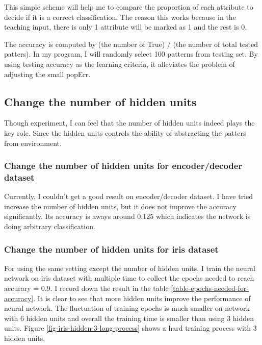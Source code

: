 \documentclass[11pt]{article}
\begin{document}
This simple scheme will help me to compare the proportion of each attribute to decide if it is a correct classification. The reason this works because in the teaching input, there is only 1 attribute will be marked as 1 and the rest is 0.

The accuracy is computed by (the number of True) / (the number of total tested patters). In my program, I will randomly select 100 patterns from testing set. By using testing accuracy as the learning criteria, it alleviates the problem of adjusting the small popErr.

\subsection{Change the number of hidden units}
\label{sec-3-2}
Though experiment, I can feel that the number of hidden units indeed plays the key role. Since the hidden units controls the ability of abstracting the patters from environment.
\subsubsection{Change the number of hidden units for encoder/decoder dataset}
\label{sec-3-2-1}
Currently, I couldn't get a good result on encoder/decoder dataset. I have tried increase the number of hidden units, but it does not improve the accuracy significantly. Its accuracy is aways around 0.125 which indicates the network is doing arbitrary classification.


\subsubsection{Change the number of hidden units for iris dataset}
\label{sec-3-2-2}
For using the same setting except the number of hidden units, I train the neural network on iris dataset with multiple time to collect the epochs needed to reach accurary = 0.9. I record down the result in the table \ref{table-epochs-needed-for-accuracy}. It is clear to see that more hidden units improve the performance of neural network. The fluctuation of training epochs is much smaller on network with 6 hidden units and overall the training time is smaller than using 3 hidden units. Figure \ref{fig-iris-hidden-3-long-process}  shows a hard training process with 3 hidden units.
\end{document}
